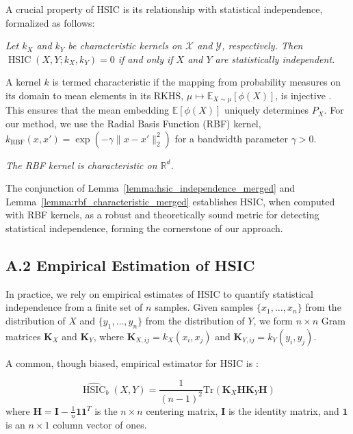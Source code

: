 \noindent A crucial property of HSIC is its relationship with statistical independence, formalized as follows:

\begin{lemma}
\label{lemma:hsic_independence_merged}
\textit{Let $k_X$ and $k_Y$ be characteristic kernels on $\mathcal{X}$ and $\mathcal{Y}$, respectively. Then $\operatorname{HSIC}(X,Y; k_X, k_Y) = 0$ if and only if $X$ and $Y$ are statistically independent.}
\end{lemma}
A kernel $k$ is termed characteristic if the mapping from probability measures on its domain to mean elements in its RKHS, $\mu \mapsto \mathbb{E}_{X \sim \mu}[\phi(X)]$, is injective \citep{JMLR:v11:sriperumbudur10a}. This ensures that the mean embedding $\mathbb{E}[\phi(X)]$ uniquely determines $P_X$. For our method, we use the Radial Basis Function (RBF) kernel, $k_{\text{RBF}}(x, x') = \exp(-\gamma \|x - x'\|_2^2)$ for a bandwidth parameter $\gamma > 0$.

\begin{lemma}[\citet{5122}]
\label{lemma:rbf_characteristic_merged}
\textit{The RBF kernel is characteristic on $\mathbb{R}^d$.}
\end{lemma}
The conjunction of Lemma~\ref{lemma:hsic_independence_merged} and Lemma~\ref{lemma:rbf_characteristic_merged} establishes HSIC, when computed with RBF kernels, as a robust and theoretically sound metric for detecting statistical independence, forming the cornerstone of our approach.

\subsection*{A.2 Empirical Estimation of HSIC}
\label{subsec:empirical_hsic_foundation}
In practice, we rely on empirical estimates of HSIC to quantify statistical independence from a finite set of $n$ samples. Given samples $\{x_1, \dots, x_n\}$ from the distribution of $X$ and $\{y_1, \dots, y_n\}$ from the distribution of $Y$, we form $n \times n$ Gram matrices $\mathbf{K}_X$ and $\mathbf{K}_Y$, where $\mathbf{K}_{X,ij} = k_X(x_i, x_j)$ and $\mathbf{K}_{Y,ij} = k_Y(y_i, y_j)$.

A common, though biased, empirical estimator for HSIC is \citep{gretton05a}:

\begin{equation}
\widehat{\operatorname{HSIC}}_b(X,Y) = \frac{1}{(n-1)^2} \text{Tr}(\mathbf{K}_X \mathbf{H} \mathbf{K}_Y \mathbf{H})
\label{eq:biased_HSIC_foundation}
\end{equation}
where $\mathbf{H} = \mathbf{I} - \frac{1}{n}\mathbf{1}\mathbf{1}^T$ is the $n \times n$ centering matrix, $\mathbf{I}$ is the identity matrix, and $\mathbf{1}$ is an $n \times 1$ column vector of ones.

